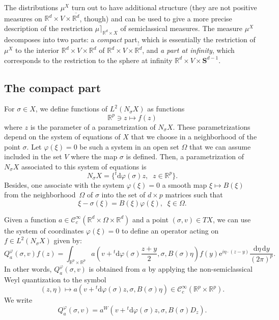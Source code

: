 \documentclass[AHL,Unicode,longabstracts]{cedram}
\newcommand*\R{{\mathbb R}}
\numberwithin{equation}{section}
\newcommand{\ee}{{\mathrm e}}
\newcommand*{\dd}{\mathrm{d}}
\newcommand*{\dy}{\dd y}
\newcommand*{\deta}{\dd \eta}
\newcommand*{\dphi}{\dd \varphi}
\begin{document}
The distributions $ \mu^{X}$ turn out to have additional structure (they are not positive measures on $\R^d\times V\times \overline{\R^d}$, though) and can be used to give a more precise description of the restriction $\mu\rceil_{\R^d\times X}$ of semiclassical measures. The measure $\mu^{X}$ decomposes into two parts: a \emph{compact} part, which is essentially the restriction of $\mu^{X}$ to the interior $\R^d\times V\times \R^d$ of $\R^d\times V\times \overline{\R^d}$, and \emph{a part at infinity}, which corresponds to the restriction to the sphere at infinity $\R^d\times V\times\mathbf{S}^{d-1}$.



\subsection{The compact part}
For $\sigma\in X$, we define functions of $L^2(N_\sigma X)$ as functions
\[
\R^p\ni z\mapsto f(z)
\]
where $z$ is the parameter of a parametrization of $N_\sigma X$. These parametrizations depend on the system of equations of $X$ that we choose in a neighborhood of the point $\sigma$. Let $\varphi(\xi)=0$ be such a system in an open set $\Omega$ that we can assume included in the set $V$ where the map $\sigma$ is defined. Then, a parametrization of $N_\sigma X$ associated to this system of equations is
\[
N_\sigma X= \{ {}^t\dphi(\sigma) z,\;\; z\in\R^p\}.
\]
Besides, one associate with the system $\varphi(\xi)=0$ a smooth map $\xi\mapsto B(\xi)$ from the neighborhood~$\Omega$ of $\sigma$ into the set of $d\times p$ matrices such that
\begin{equation}\label{def:B}
\xi-\sigma(\xi)=B(\xi)\varphi(\xi),\;\;\xi\in\Omega.
\end{equation}


Given a function $a\in {\mathcal C}^\infty_c(\R^d\times \Omega\times \R^d)$ and a point $(\sigma,v)\in TX$, we can use the system of coordinates $\varphi(\xi)=0$ to define an operator acting on $f\in L^2(N_\sigma X)$ given by:
\[
Q_a^\varphi (\sigma,v)f(z)=\int_{\R^p\times \R^p}a\left(v+ {}^t\dphi(\sigma) \frac{z+y}{2},\sigma, B(\sigma) \eta\right)f(y){\ee}^{i\eta\cdot (z-y)}\frac{\deta\,\dy}{(2\pi)^p}.
\]
In other words, $Q_a^\varphi(\sigma,v)$ is obtained from $a$ by applying the non-semiclassical Weyl quantization to the symbol
\[
(z,\eta)\mapsto a\left(v+ {}^t\dphi(\sigma) z,\sigma, B(\sigma) \eta\right)\in {\mathcal C}^\infty_c(\R^p\times\R^p).
\]
We write
\[
Q_a^\varphi (\sigma,v)= a^W\left(v+ {}^t\dphi(\sigma) z,\sigma, B(\sigma) D_z\right).
\]
\end{document}
